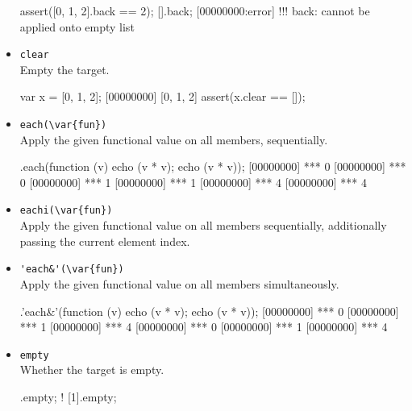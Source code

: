 \begin{itemize}
\begin{urbiscript}[firstnumber=last]
assert([0, 1, 2].back == 2);
[].back;
[00000000:error] !!! back: cannot be applied onto empty list
\end{urbiscript}

\item \lstinline|clear|\\
  Empty the target.

\begin{urbiscript}[firstnumber=last]
var x = [0, 1, 2];
[00000000] [0, 1, 2]
assert(x.clear == []);
\end{urbiscript}

\item \lstinline|each(\var{fun})|\\
  Apply the given functional value  on all members,
  sequentially.

\begin{urbiscript}[firstnumber=last]
[0, 1, 2].each(function (v) {echo (v * v); echo (v * v)});
[00000000] *** 0
[00000000] *** 0
[00000000] *** 1
[00000000] *** 1
[00000000] *** 4
[00000000] *** 4
\end{urbiscript}

\item \lstinline|eachi(\var{fun})|\\
  Apply the given functional value  on all members
  sequentially, additionally passing the current element index.


\item \lstinline|'each&'(\var{fun})|\\
Apply the given functional value on all members simultaneously.

\begin{urbiscript}[firstnumber=last]
[0, 1, 2].'each&'(function (v) {echo (v * v); echo (v * v)});
[00000000] *** 0
[00000000] *** 1
[00000000] *** 4
[00000000] *** 0
[00000000] *** 1
[00000000] *** 4
\end{urbiscript}

\item \lstinline|empty|\\
  Whether the target is empty.

\begin{urbiassert}[firstnumber=last]
[].empty;
! [1].empty;
\end{urbiassert}


\end{itemize}
